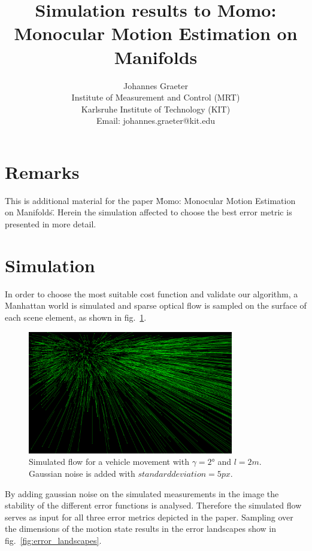 \documentclass[a4paper]{article}
\begin{document}
\title{Simulation results to Momo: Monocular Motion Estimation on Manifolds}
\author{Johannes Graeter\\
Institute of  Measurement and Control (MRT)\\
Karlsruhe Institute of Technology (KIT)\\
Email: johannes.graeter@kit.edu
}

\maketitle
\section{Remarks}
This is additional material for the paper \"Momo: Monocular Motion Estimation on Manifolds\".
Herein the simulation affected to choose the best error metric is presented in more detail.

\section{Simulation}
In order to choose the most suitable cost function and validate our algorithm, a Manhattan world is simulated and sparse optical flow is sampled on the surface of each scene element, as shown in fig.~\ref{fig:flow_simulation}.

\begin{figure}[htb]
\centering
\includegraphics[width=0.8\textwidth]{flow_simulation}
\caption{Simulated flow for a vehicle movement with $\gamma=2°$ and $l=2m$. Gaussian noise is added with $standard deviation=5px$.}
\label{fig:flow_simulation}
\end{figure}

By adding gaussian noise on the simulated measurements in the image the stability of the different error functions is analysed.
Therefore the simulated flow serves as input for all three error metrics depicted in the paper.
Sampling over the dimensions of the motion state results in the error landscapes show in fig.~\ref{fig:error_landscapes}.
\end{document}

